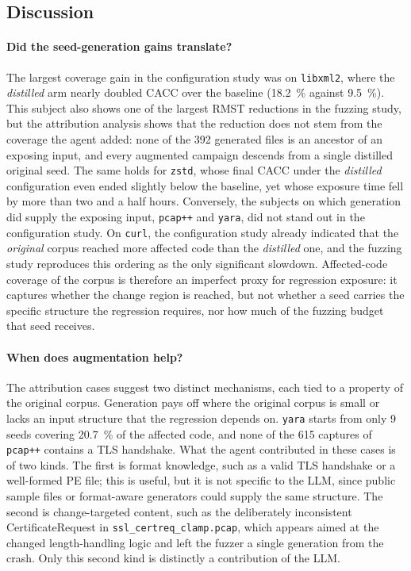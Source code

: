 \subsection{Discussion}
 
\paragraph{Did the seed-generation gains translate?}
The largest coverage gain in the configuration study was on \texttt{libxml2}, where the \emph{distilled} arm nearly doubled \ac{CACC} over the baseline (\SI{18.2}{\percent} against \SI{9.5}{\percent}).
This subject also shows one of the largest \ac{RMST} reductions in the fuzzing study, but the attribution analysis shows that the reduction does not stem from the coverage the agent added: none of the \num{392} generated files is an ancestor of an exposing input, and every augmented campaign descends from a single distilled original seed.
The same holds for \texttt{zstd}, whose final \ac{CACC} under the \emph{distilled} configuration even ended slightly below the baseline, yet whose exposure time fell by more than two and a half hours.
Conversely, the subjects on which generation did supply the exposing input, \texttt{pcap++} and \texttt{yara}, did not stand out in the configuration study.
On \texttt{curl}, the configuration study already indicated that the \emph{original} corpus reached more affected code than the \emph{distilled} one, and the fuzzing study reproduces this ordering as the only significant slowdown.
Affected-code coverage of the corpus is therefore an imperfect proxy for regression exposure: it captures whether the change region is reached, but not whether a seed carries the specific structure the regression requires, nor how much of the fuzzing budget that seed receives.
 
\paragraph{When does augmentation help?}
The attribution cases suggest two distinct mechanisms, each tied to a property of the original corpus.
Generation pays off where the original corpus is small or lacks an input structure that the regression depends on.
\texttt{yara} starts from only \num{9} seeds covering \SI{20.7}{\percent} of the affected code, and none of the \num{615} captures of \texttt{pcap++} contains a TLS handshake.
What the agent contributed in these cases is of two kinds.
The first is format knowledge, such as a valid TLS handshake or a well-formed PE file; this is useful, but it is not specific to the \ac{LLM}, since public sample files or format-aware generators could supply the same structure.
The second is change-targeted content, such as the deliberately inconsistent CertificateRequest in \texttt{ssl\_certreq\_clamp.pcap}, which appears aimed at the changed length-handling logic and left the fuzzer a single generation from the crash.
Only this second kind is distinctly a contribution of the \ac{LLM}.
 
